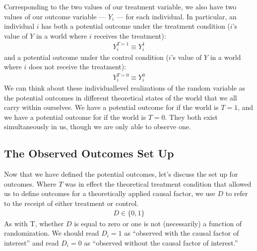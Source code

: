 \documentclass[letterpaper,10pt,english]{jupyterBook}
\begin{document}
\sphinxAtStartPar
Corresponding to the two values of our treatment variable, we also have two values of our outcome variable — \(Y_i\) — for each individual. In particular, an individual \(i\) has both a potential outcome under the treatment condition (\(i\)’s value of \(Y\) in a world where \(i\) receives the treatment):
\begin{equation*}
\begin{split}Y^{T=1}_i \equiv Y^{1}_i\end{split}
\end{equation*}
\sphinxAtStartPar
and a potential outcome under the control condition (\(i\)’s value of \(Y\) in a world where \(i\) does not receive the treatment):
\begin{equation*}
\begin{split}Y^{T=0}_i \equiv Y^{0}_i\end{split}
\end{equation*}
\sphinxAtStartPar
We can think about these individual\sphinxhyphen{}level realizations of the random variable as the potential outcomes in different theoretical states of the world that we all carry within ourselves. We have a potential outcome for if the world is \(T=1\), and we have a potential outcome for if the world is \(T=0\). They both exist simultaneously in us, though we are only able to observe one.


\subsection{The Observed Outcomes Set Up}
\label{\detokenize{35_causal/10_potential_outcomes:the-observed-outcomes-set-up}}
\sphinxAtStartPar
Now that we have defined the potential outcomes, let’s discuss the set up for  outcomes. Where \(T\) was in effect the theoretical treatment condition that allowed us to define  outcomes for a theoretically applied causal factor, we use \(D\) to refer to the  receipt of either treatment or control.
\begin{equation*}
\begin{split}D \in \{0,1\}\end{split}
\end{equation*}
\sphinxAtStartPar
As with T, whether \(D\) is equal to zero or one is not (necessarily) a function of randomization. We should read \(D_i = 1\) as “observed with the causal factor of interest” and read \(D_i = 0\) as “observed without the causal factor of interest.”
\end{document}
